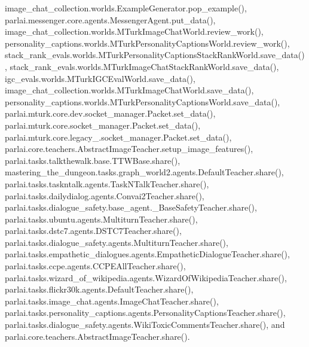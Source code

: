 image\+\_\+chat\+\_\+collection.\+worlds.\+Example\+Generator.\+pop\+\_\+example(), parlai.\+messenger.\+core.\+agents.\+Messenger\+Agent.\+put\+\_\+data(), image\+\_\+chat\+\_\+collection.\+worlds.\+M\+Turk\+Image\+Chat\+World.\+review\+\_\+work(), personality\+\_\+captions.\+worlds.\+M\+Turk\+Personality\+Captions\+World.\+review\+\_\+work(), stack\+\_\+rank\+\_\+evals.\+worlds.\+M\+Turk\+Personality\+Captions\+Stack\+Rank\+World.\+save\+\_\+data(), stack\+\_\+rank\+\_\+evals.\+worlds.\+M\+Turk\+Image\+Chat\+Stack\+Rank\+World.\+save\+\_\+data(), igc\+\_\+evals.\+worlds.\+M\+Turk\+I\+G\+C\+Eval\+World.\+save\+\_\+data(), image\+\_\+chat\+\_\+collection.\+worlds.\+M\+Turk\+Image\+Chat\+World.\+save\+\_\+data(), personality\+\_\+captions.\+worlds.\+M\+Turk\+Personality\+Captions\+World.\+save\+\_\+data(), parlai.\+mturk.\+core.\+dev.\+socket\+\_\+manager.\+Packet.\+set\+\_\+data(), parlai.\+mturk.\+core.\+socket\+\_\+manager.\+Packet.\+set\+\_\+data(), parlai.\+mturk.\+core.\+legacy\+\_.\+socket\+\_\+manager.\+Packet.\+set\+\_\+data(), parlai.\+core.\+teachers.\+Abstract\+Image\+Teacher.\+setup\+\_\+image\+\_\+features(), parlai.\+tasks.\+talkthewalk.\+base.\+T\+T\+W\+Base.\+share(), mastering\+\_\+the\+\_\+dungeon.\+tasks.\+graph\+\_\+world2.\+agents.\+Default\+Teacher.\+share(), parlai.\+tasks.\+taskntalk.\+agents.\+Task\+N\+Talk\+Teacher.\+share(), parlai.\+tasks.\+dailydialog.\+agents.\+Convai2\+Teacher.\+share(), parlai.\+tasks.\+dialogue\+\_\+safety.\+base\+\_\+agent.\+\_\+\+Base\+Safety\+Teacher.\+share(), parlai.\+tasks.\+ubuntu.\+agents.\+Multiturn\+Teacher.\+share(), parlai.\+tasks.\+dstc7.\+agents.\+D\+S\+T\+C7\+Teacher.\+share(), parlai.\+tasks.\+dialogue\+\_\+safety.\+agents.\+Multiturn\+Teacher.\+share(), parlai.\+tasks.\+empathetic\+\_\+dialogues.\+agents.\+Empathetic\+Dialogue\+Teacher.\+share(), parlai.\+tasks.\+ccpe.\+agents.\+C\+C\+P\+E\+All\+Teacher.\+share(), parlai.\+tasks.\+wizard\+\_\+of\+\_\+wikipedia.\+agents.\+Wizard\+Of\+Wikipedia\+Teacher.\+share(), parlai.\+tasks.\+flickr30k.\+agents.\+Default\+Teacher.\+share(), parlai.\+tasks.\+image\+\_\+chat.\+agents.\+Image\+Chat\+Teacher.\+share(), parlai.\+tasks.\+personality\+\_\+captions.\+agents.\+Personality\+Captions\+Teacher.\+share(), parlai.\+tasks.\+dialogue\+\_\+safety.\+agents.\+Wiki\+Toxic\+Comments\+Teacher.\+share(), and parlai.\+core.\+teachers.\+Abstract\+Image\+Teacher.\+share().

\mbox{\label{classparlai_1_1core_1_1teachers_1_1StreamDialogData_a35ddb652bb3255dba53d5fd69046ebb7}} 
